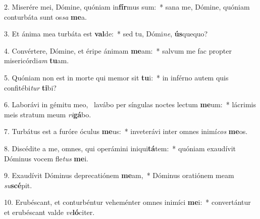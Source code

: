 2. Miserére mei, Dómine, quóniam in\textbf{fír}mus sum:~*  sana me, Dómine, quóniam conturbáta sunt os\textit{sa} \textbf{me}a.\

3. Et ánima mea turbáta est \textbf{val}de:~*  sed tu, Dómi\textit{ne}, \textbf{ús}quequo?\

4. Convértere, Dómine, et éripe ánimam \textbf{me}am:~*  salvum me fac propter misericórdi\textit{am} \textbf{tu}am.\

5. Quóniam non est in morte qui memor sit \textbf{tu}i:~*  in inférno autem quis confitébi\textit{tur} \textbf{ti}bi?\

6. Laborávi in gémitu meo, \dag\  lavábo per síngulas noctes lectum \textbf{me}um:~*  lácrimis meis stratum meum \textit{ri}\textbf{gá}bo.\

7. Turbátus est a furóre óculus \textbf{me}us:~*  inveterávi inter omnes inimí\textit{cos} \textbf{me}os.\

8. Discédite a me, omnes, qui operámini iniqui\textbf{tá}tem:~*  quóniam exaudívit Dóminus vocem fle\textit{tus} \textbf{me}i.\

9. Exaudívit Dóminus deprecatiónem \textbf{me}am,~*  Dóminus oratiónem meam \textit{su}\textbf{scé}pit.\

10. Erubéscant, et conturbéntur veheménter omnes inimíci \textbf{me}i:~*  convertántur et erubéscant valde \textit{ve}\textbf{ló}citer.\

